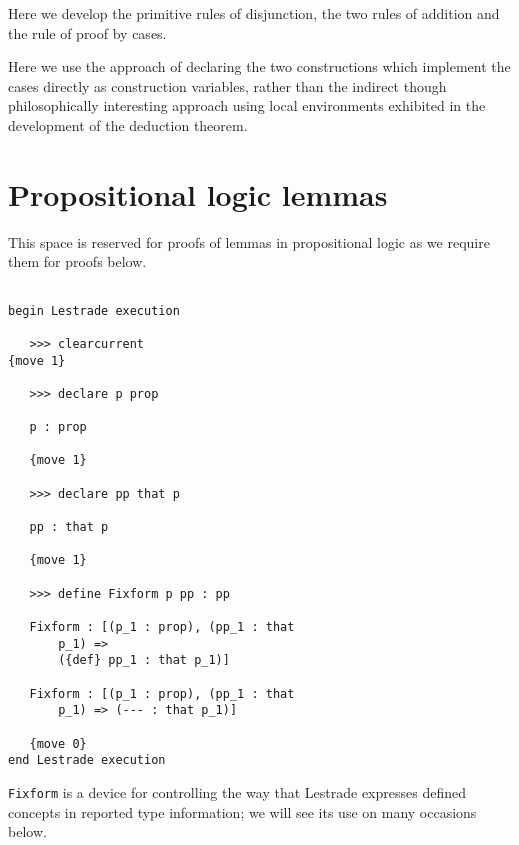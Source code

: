 \documentclass[12pt]{article}
\begin{document}
Here we develop the primitive rules of disjunction, the two rules of addition and the rule of proof by cases.

Here we use the approach of declaring the two constructions which implement the cases directly as construction variables, rather than the indirect though philosophically interesting approach using local environments exhibited in the development of the deduction theorem.

\section{Propositional logic lemmas}

This space is reserved for proofs of lemmas in propositional logic as we require them for proofs below.

\begin{verbatim}

begin Lestrade execution

   >>> clearcurrent
{move 1}

   >>> declare p prop

   p : prop

   {move 1}

   >>> declare pp that p

   pp : that p

   {move 1}

   >>> define Fixform p pp : pp

   Fixform : [(p_1 : prop), (pp_1 : that 
       p_1) => 
       ({def} pp_1 : that p_1)]

   Fixform : [(p_1 : prop), (pp_1 : that 
       p_1) => (--- : that p_1)]

   {move 0}
end Lestrade execution
\end{verbatim}

{\tt Fixform} is a device for controlling the way that Lestrade expresses defined concepts in reported type information; we will see its use on many occasions below.
\end{document}
